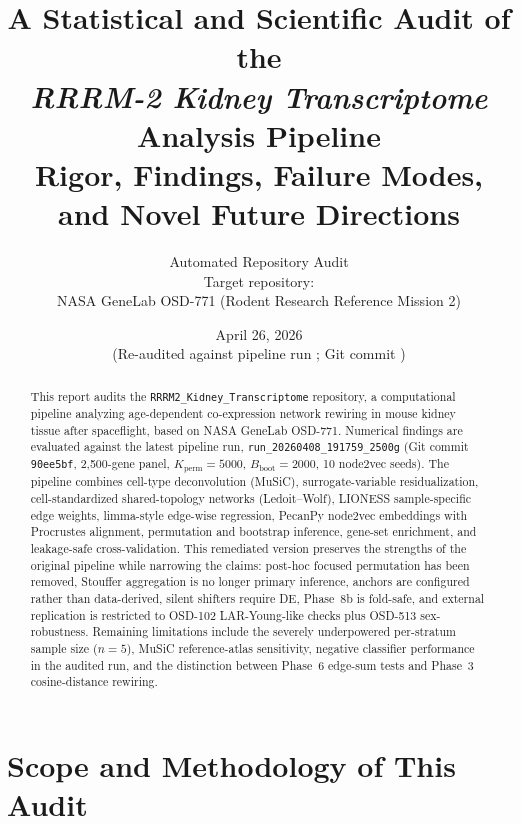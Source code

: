 \documentclass[11pt]{article}
\title{\textbf{A Statistical and Scientific Audit of the \\
\emph{RRRM-2 Kidney Transcriptome} Analysis Pipeline} \\[0.5em]
\large Rigor, Findings, Failure Modes, and Novel Future Directions}
\author{Automated Repository Audit \\
\small Target repository: \code{RRRM2\_Kidney\_Transcriptome} \\
\small NASA GeneLab OSD-771 (Rodent Research Reference Mission 2)}
\date{April 26, 2026 \\
\small (Re-audited against pipeline run \code{run\_20260408\_191759\_2500g}; Git commit \code{90ee5bf})}
\newcommand{\code}[1]{\texttt{#1}}
\newcommand{\pkg}[1]{\textsf{#1}}
\begin{document}
\maketitle

\begin{abstract}
\noindent
This report audits the \code{RRRM2\_Kidney\_Transcriptome} repository, a computational pipeline analyzing age-dependent co-expression network rewiring in mouse kidney tissue after spaceflight, based on NASA GeneLab OSD-771. Numerical findings are evaluated against the latest pipeline run, \code{run\_20260408\_191759\_2500g} (Git commit \code{90ee5bf}, 2,500-gene panel, $K_{\text{perm}}{=}5000$, $B_{\text{boot}}{=}2000$, 10 node2vec seeds). The pipeline combines cell-type deconvolution (MuSiC), surrogate-variable residualization, cell-standardized shared-topology networks (Ledoit--Wolf), LIONESS sample-specific edge weights, limma-style edge-wise regression, \pkg{PecanPy} node2vec embeddings with Procrustes alignment, permutation and bootstrap inference, gene-set enrichment, and leakage-safe cross-validation. This remediated version preserves the strengths of the original pipeline while narrowing the claims: post-hoc focused permutation has been removed, Stouffer aggregation is no longer primary inference, anchors are configured rather than data-derived, silent shifters require DE, Phase~8b is fold-safe, and external replication is restricted to OSD-102 LAR-Young-like checks plus OSD-513 sex-robustness. Remaining limitations include the severely underpowered per-stratum sample size ($n{=}5$), MuSiC reference-atlas sensitivity, negative classifier performance in the audited run, and the distinction between Phase~6 edge-sum tests and Phase~3 cosine-distance rewiring.
\end{abstract}

\tableofcontents

\clearpage

\section{Scope and Methodology of This Audit}
\end{document}
